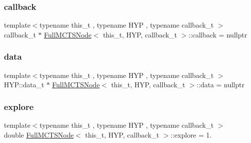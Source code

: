 \subsubsection{\texorpdfstring{callback}{callback}}
{\footnotesize\ttfamily template$<$typename this\+\_\+t , typename H\+YP , typename callback\+\_\+t $>$ \\
callback\+\_\+t $\ast$ \hyperlink{class_full_m_c_t_s_node}{Full\+M\+C\+T\+S\+Node}$<$ this\+\_\+t, H\+YP, callback\+\_\+t $>$\+::callback = nullptr\hspace{0.3cm}{\ttfamily [static]}}

\mbox{\label{class_full_m_c_t_s_node_a77c852db32724d86ad449eb08a9a1e83}} 
\subsubsection{\texorpdfstring{data}{data}}
{\footnotesize\ttfamily template$<$typename this\+\_\+t , typename H\+YP , typename callback\+\_\+t $>$ \\
H\+Y\+P\+::data\+\_\+t $\ast$ \hyperlink{class_full_m_c_t_s_node}{Full\+M\+C\+T\+S\+Node}$<$ this\+\_\+t, H\+YP, callback\+\_\+t $>$\+::data = nullptr\hspace{0.3cm}{\ttfamily [static]}}

\mbox{\label{class_full_m_c_t_s_node_a4f2a0854002ca86dc0917487ba75a273}} 
\subsubsection{\texorpdfstring{explore}{explore}}
{\footnotesize\ttfamily template$<$typename this\+\_\+t , typename H\+YP , typename callback\+\_\+t $>$ \\
double \hyperlink{class_full_m_c_t_s_node}{Full\+M\+C\+T\+S\+Node}$<$ this\+\_\+t, H\+YP, callback\+\_\+t $>$\+::explore = 1.\hspace{0.3cm}{\ttfamily [static]}}

\mbox{\label{class_full_m_c_t_s_node_a35fe0f5a86059bd1041151dbe982d649}} 
